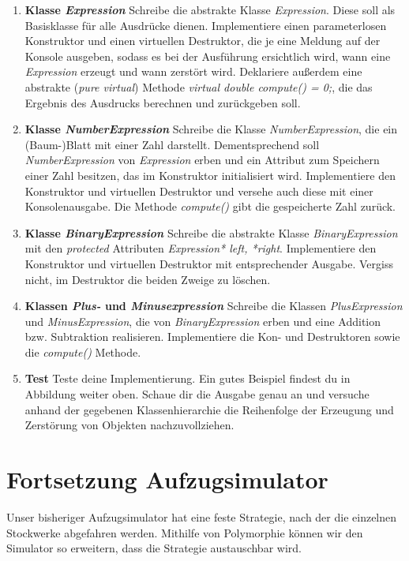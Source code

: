 \begin{enumerate}

\item \textbf{Klasse \emph{Expression}}
Schreibe die abstrakte Klasse \emph{Expression}.
Diese soll als Basisklasse für alle Ausdrücke dienen.
Implementiere einen parameterlosen Konstruktor und einen virtuellen Destruktor, die je eine Meldung auf der Konsole ausgeben, sodass es bei der Ausführung ersichtlich wird, wann eine \emph{Expression} erzeugt und wann zerstört wird.
Deklariere außerdem eine abstrakte (\emph{pure virtual}) Methode \emph{virtual double compute() = 0;}, die das Ergebnis des Ausdrucks berechnen und zurückgeben soll. 

\item \textbf{Klasse \emph{NumberExpression}}
Schreibe die Klasse \emph{NumberExpression}, die ein (Baum-)Blatt mit einer Zahl darstellt.
Dementsprechend soll \emph{NumberExpression} von \emph{Expression} erben und ein Attribut zum Speichern einer Zahl besitzen, das im Konstruktor initialisiert wird.
Implementiere den Konstruktor und virtuellen Destruktor und versehe auch diese mit einer Konsolenausgabe.
Die Methode \emph{compute()} gibt die gespeicherte Zahl zurück.

\item \textbf{Klasse \emph{BinaryExpression}}
Schreibe die abstrakte Klasse \emph{BinaryExpression} mit den \emph{protected} Attributen \emph{Expression* left, *right}.
Implementiere den Konstruktor und virtuellen Destruktor mit entsprechender Ausgabe.
Vergiss nicht, im Destruktor die beiden Zweige zu löschen. 

\item \textbf{Klassen \emph{Plus-} und \emph{Minusexpression}}
Schreibe die Klassen \emph{PlusExpression} und \emph{MinusExpression}, die von \emph{BinaryExpression} erben und eine Addition bzw. Subtraktion realisieren. 
Implementiere die Kon- und Destruktoren sowie die \emph{compute()} Methode.

\item \textbf{Test}
Teste deine Implementierung.
Ein gutes Beispiel findest du in Abbildung weiter oben.
Schaue dir die Ausgabe genau an und versuche anhand der gegebenen Klassenhierarchie die Reihenfolge der Erzeugung und Zerstörung von Objekten  nachzuvollziehen.

\end{enumerate}

\section{Fortsetzung Aufzugsimulator}
Unser bisheriger Aufzugsimulator hat eine feste Strategie, nach der die einzelnen Stockwerke abgefahren werden. Mithilfe von Polymorphie können wir den Simulator so erweitern, dass die Strategie austauschbar wird.  

